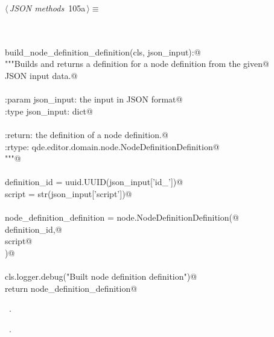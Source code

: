 \documentclass[
    a4paper,      %
    10pt,         %
    openright,    %
    notitlepage,  %
    parskip=half, %
]{scrreprt}       %
\theoremstyle{definition}                    %
\begin{document}
\begin{flushleft} \small
\begin{minipage}{\linewidth}\label{scrap171}\raggedright\small
{} $\langle\,${\itshape JSON methods}\nobreak\ {\footnotesize {105a}}$\,\rangle\equiv$
\vspace{-1exm}
\begin{list}{}{} \item
\mbox{}\lstinline@@\\
\mbox{}\lstinline@classmethod@\\
\mbox{}\lstinline@def build_node_definition_definition(cls, json_input):@\\
\mbox{}\lstinline@    """Builds and returns a definition for a node definition from the given@\\
\mbox{}\lstinline@    JSON input data.@\\
\mbox{}\lstinline@@\\
\mbox{}\lstinline@    :param json_input: the input in JSON format@\\
\mbox{}\lstinline@    :type  json_input: dict@\\
\mbox{}\lstinline@@\\
\mbox{}\lstinline@    :return: the definition of a node definition.@\\
\mbox{}\lstinline@    :rtype:  qde.editor.domain.node.NodeDefinitionDefinition@\\
\mbox{}\lstinline@    """@\\
\mbox{}\lstinline@@\\
\mbox{}\lstinline@    definition_id = uuid.UUID(json_input['id_'])@\\
\mbox{}\lstinline@    script        = str(json_input['script'])@\\
\mbox{}\lstinline@@\\
\mbox{}\lstinline@    node_definition_definition = node.NodeDefinitionDefinition(@\\
\mbox{}\lstinline@        definition_id,@\\
\mbox{}\lstinline@        script@\\
\mbox{}\lstinline@    )@\\
\mbox{}\lstinline@@\\
\mbox{}\lstinline@    cls.logger.debug("Built node definition definition")@\\
\mbox{}\lstinline@    return node_definition_definition@\\
\mbox{}\lstinline@@{\NWsep}
\end{list}
\vspace{-1.5ex}
\footnotesize
\begin{list}{}{\setlength{\itemsep}{-\parsep}\setlength{\itemindent}{-\leftmargin}}
\item \NWtxtMacroDefBy\ .
\item \NWtxtMacroRefIn\ .


\end{list}
\end{minipage}
\end{flushleft}
\end{document}
